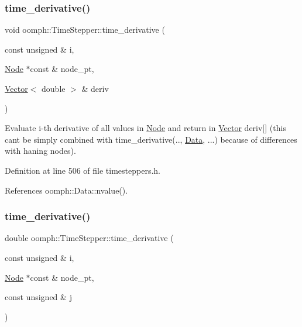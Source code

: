\subsubsection{\texorpdfstring{time\+\_\+derivative()}{time\_derivative()}\hspace{0.1cm}{\footnotesize\ttfamily [3/4]}}
{\footnotesize\ttfamily void oomph\+::\+Time\+Stepper\+::time\+\_\+derivative (\begin{DoxyParamCaption}\item[{const unsigned \&}]{i,  }\item[{\hyperlink{classoomph_1_1Node}{Node} $\ast$const \&}]{node\+\_\+pt,  }\item[{\hyperlink{classoomph_1_1Vector}{Vector}$<$ double $>$ \&}]{deriv }\end{DoxyParamCaption})\hspace{0.3cm}{\ttfamily [inline]}}



Evaluate i-\/th derivative of all values in \hyperlink{classoomph_1_1Node}{Node} and return in \hyperlink{classoomph_1_1Vector}{Vector} deriv\mbox{[}\mbox{]} (this can\textquotesingle{}t be simply combined with time\+\_\+derivative(.., \hyperlink{classoomph_1_1Data}{Data}, ...) because of differences with haning nodes). 



Definition at line 506 of file timesteppers.\+h.



References oomph\+::\+Data\+::nvalue().

\mbox{\label{classoomph_1_1TimeStepper_af02a53d7047869cbf0d563272b4de908}} 
\subsubsection{\texorpdfstring{time\+\_\+derivative()}{time\_derivative()}\hspace{0.1cm}{\footnotesize\ttfamily [4/4]}}
{\footnotesize\ttfamily double oomph\+::\+Time\+Stepper\+::time\+\_\+derivative (\begin{DoxyParamCaption}\item[{const unsigned \&}]{i,  }\item[{\hyperlink{classoomph_1_1Node}{Node} $\ast$const \&}]{node\+\_\+pt,  }\item[{const unsigned \&}]{j }\end{DoxyParamCaption})\hspace{0.3cm}{\ttfamily [inline]}}



